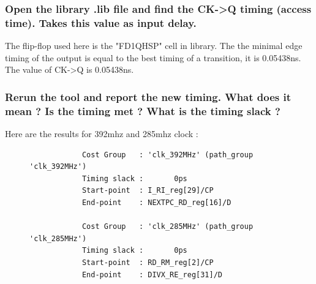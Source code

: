 \documentclass[11pt,a4paper,sans,dvipsnames]{report}
\begin{document}
	\newpage
	\subsubsection*{Open the library .lib file and find the CK-\textgreater Q timing (access time). Takes this value as input delay.}
	The flip-flop used here is the "FD1QHSP" cell in library. The the minimal edge timing of the output is equal to the best timing of a transition, it is 0.05438ns. The value of CK-\textgreater Q is 0.05438ns.


	\subsubsection*{Rerun the tool and report the new timing. What does it mean ? Is the timing met ? What is the timing slack ?}

	Here are the results for 392mhz and 285mhz clock :

	\begin{figure}[h!]
		\centering
		\begin{lstlisting}
			Cost Group   : 'clk_392MHz' (path_group 'clk_392MHz')
			Timing slack :       0ps 
			Start-point  : I_RI_reg[29]/CP
			End-point    : NEXTPC_RD_reg[16]/D

			Cost Group   : 'clk_285MHz' (path_group 'clk_285MHz')
			Timing slack :       0ps 
			Start-point  : RD_RM_reg[2]/CP
			End-point    : DIVX_RE_reg[31]/D
		\end{lstlisting}
	\end{figure}




\end{document}
